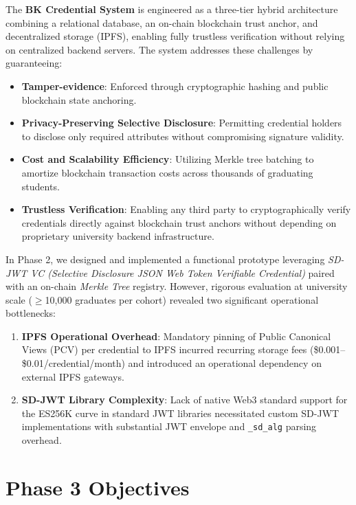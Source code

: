 The \textbf{BK Credential System} is engineered as a three-tier hybrid architecture combining a relational database, an on-chain blockchain trust anchor, and decentralized storage (IPFS), enabling fully trustless verification without relying on centralized backend servers. The system addresses these challenges by guaranteeing:
\begin{itemize}
    \item \textbf{Tamper-evidence}: Enforced through cryptographic hashing and public blockchain state anchoring.
    \item \textbf{Privacy-Preserving Selective Disclosure}: Permitting credential holders to disclose only required attributes without compromising signature validity.
    \item \textbf{Cost and Scalability Efficiency}: Utilizing Merkle tree batching to amortize blockchain transaction costs across thousands of graduating students.
    \item \textbf{Trustless Verification}: Enabling any third party to cryptographically verify credentials directly against blockchain trust anchors without depending on proprietary university backend infrastructure.
\end{itemize}

In Phase 2, we designed and implemented a functional prototype leveraging \textit{SD-JWT VC (Selective Disclosure JSON Web Token Verifiable Credential)} paired with an on-chain \textit{Merkle Tree} registry. However, rigorous evaluation at university scale ($\geq$10,000 graduates per cohort) revealed two significant operational bottlenecks:

\begin{enumerate}
    \item \textbf{IPFS Operational Overhead}: Mandatory pinning of Public Canonical Views (PCV) per credential to IPFS incurred recurring storage fees (\$0.001--\$0.01/credential/month) and introduced an operational dependency on external IPFS gateways.
    \item \textbf{SD-JWT Library Complexity}: Lack of native Web3 standard support for the ES256K curve in standard JWT libraries necessitated custom SD-JWT implementations with substantial JWT envelope and \texttt{\_sd\_alg} parsing overhead.
\end{enumerate}

\section{Phase 3 Objectives}

